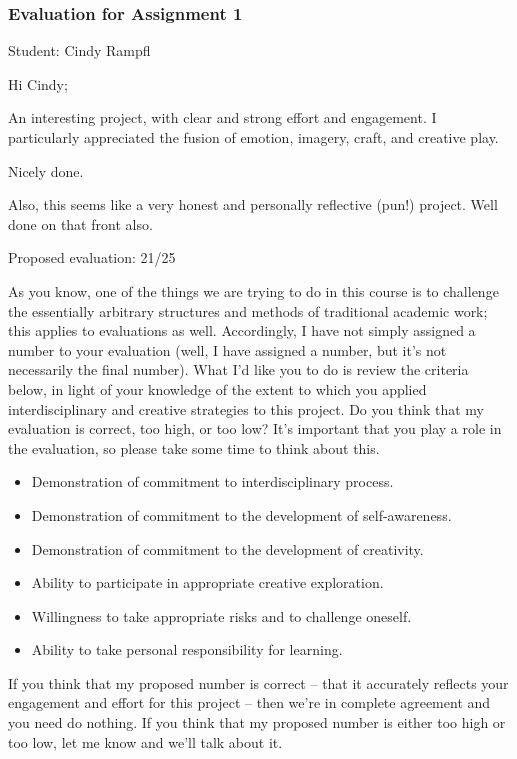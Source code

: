 \documentclass[letterpaper,10pt,DIV=9,headsepline]{scrreprt}
\begin{document}
\newpage

\subsubsection{Evaluation for Assignment 1}

Student: Cindy Rampfl

\bigskip
Hi Cindy;

An interesting project, with clear and strong effort and engagement. I
particularly appreciated the fusion of emotion, imagery, craft, and
creative play.

Nicely done.

Also, this seems like a very honest and personally reflective (pun!) project. Well done on that front also.


\bigskip
Proposed evaluation: 21/25

\bigskip
As you know, one of the things we are trying to do in this course is
to challenge the essentially arbitrary structures and methods of
traditional academic work; this applies to evaluations as well.
Accordingly, I have not simply assigned a number to your evaluation
(well, I have assigned a number, but it's not necessarily the final
number). What I'd like you to do is review the criteria below, in
light of your knowledge of the extent to which you applied
interdisciplinary and creative strategies to this project. Do you
think that my evaluation is correct, too high, or too low? It's
important that you play a role in the evaluation, so please take some
time to think about this.

\begin{itemize}
\item Demonstration of commitment to interdisciplinary process.
\item Demonstration of commitment to the development of self-awareness.
\item Demonstration of commitment to the development of creativity.
\item Ability to participate in appropriate creative exploration.
\item Willingness to take appropriate risks and to challenge oneself.
\item Ability to take personal responsibility for learning.
\end{itemize}

If you think that my proposed number is correct -- that it accurately
reflects your engagement and effort for this project -- then we're in
complete agreement and you need do nothing. If you think that my
proposed number is either too high or too low, let me know and we'll
talk about it.
\end{document}
